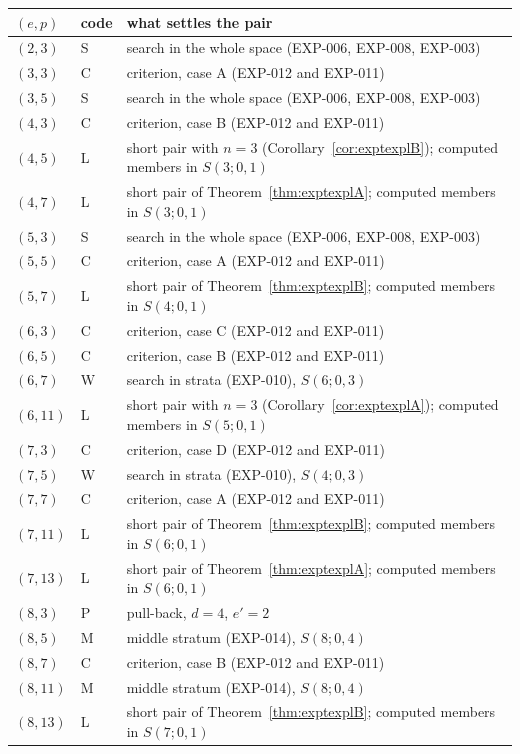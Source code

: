 \begin{tabular}{@{}ll>{\raggedright\arraybackslash}p{9.8cm}@{}}
\toprule
$(e,p)$ & code & what settles the pair\\
\midrule
$(2,3)$ & S & search in the whole space (EXP-006, EXP-008, EXP-003)\\
$(3,3)$ & C & criterion, case A (EXP-012 and EXP-011)\\
$(3,5)$ & S & search in the whole space (EXP-006, EXP-008, EXP-003)\\
$(4,3)$ & C & criterion, case B (EXP-012 and EXP-011)\\
$(4,5)$ & L & short pair with $n=3$ (Corollary~\ref{cor:exptexplB}); computed members in $S(3;0,1)$\\
$(4,7)$ & L & short pair of Theorem~\ref{thm:exptexplA}; computed members in $S(3;0,1)$\\
$(5,3)$ & S & search in the whole space (EXP-006, EXP-008, EXP-003)\\
$(5,5)$ & C & criterion, case A (EXP-012 and EXP-011)\\
$(5,7)$ & L & short pair of Theorem~\ref{thm:exptexplB}; computed members in $S(4;0,1)$\\
$(6,3)$ & C & criterion, case C (EXP-012 and EXP-011)\\
$(6,5)$ & C & criterion, case B (EXP-012 and EXP-011)\\
$(6,7)$ & W & search in strata (EXP-010), $S(6;0,3)$\\
$(6,11)$ & L & short pair with $n=3$ (Corollary~\ref{cor:exptexplA}); computed members in $S(5;0,1)$\\
$(7,3)$ & C & criterion, case D (EXP-012 and EXP-011)\\
$(7,5)$ & W & search in strata (EXP-010), $S(4;0,3)$\\
$(7,7)$ & C & criterion, case A (EXP-012 and EXP-011)\\
$(7,11)$ & L & short pair of Theorem~\ref{thm:exptexplB}; computed members in $S(6;0,1)$\\
$(7,13)$ & L & short pair of Theorem~\ref{thm:exptexplA}; computed members in $S(6;0,1)$\\
$(8,3)$ & P & pull-back, $d=4$, $e'=2$\\
$(8,5)$ & M & middle stratum (EXP-014), $S(8;0,4)$\\
$(8,7)$ & C & criterion, case B (EXP-012 and EXP-011)\\
$(8,11)$ & M & middle stratum (EXP-014), $S(8;0,4)$\\
$(8,13)$ & L & short pair of Theorem~\ref{thm:exptexplB}; computed members in $S(7;0,1)$\\

\end{tabular}
